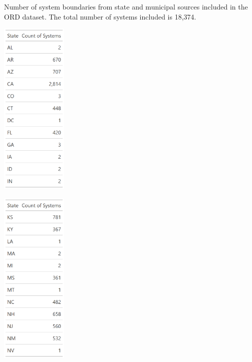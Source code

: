 \documentclass[
  letterpaper,
  DIV=11,
  numbers=noendperiod,
  oneside]{scrartcl}
\begin{document}
\begin{table}

\caption{\label{tbl-stateCounts}Number of system boundaries from state
and municipal sources included in the ORD dataset. The total number of
systems included is 18,374.}

\begin{minipage}{0.33\linewidth}
\begin{center}
\includegraphics[width=1.25in,height=\textheight]{img/state_table_1.png}
\end{center}
\end{minipage}%
%
\begin{minipage}{0.33\linewidth}
\begin{center}
\includegraphics[width=1.25in,height=\textheight]{img/state_table_2.png}
\end{center}
\end{minipage}%
%
\begin{minipage}{0.33\linewidth}

\end{minipage}
\end{table}
\end{document}
